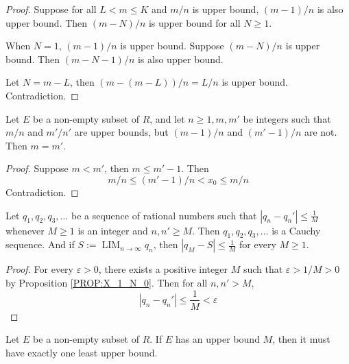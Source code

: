 \documentclass{blog}
\DeclareMathOperator{\LIM}{LIM}
\begin{document}
\begin{proof}
  Suppose for all $L < m \leq K$ and
  $m / n$ is upper bound, $(m - 1) / n$ is also upper bound.
  Then $(m - N) / n$ is upper bound for all $N \geq 1$.

  When $N = 1$, $(m - 1) / n$ is upper bound.
  Suppose $(m - N) / n$ is upper bound.
  Then $(m - N - 1) / n$ is also upper bound.

  Let $N = m - L$, then
  $(m - (m - L)) / n = L / n$ is upper bound.
  Contradiction.
\end{proof}

\begin{lemma}
  Let $E$ be a non-empty subset of $R$,
  and let $n \geq 1, m, m'$ be integers such that
  $m / n$ and $m' / n'$ are upper bounds,
  but $(m - 1) / n$ and $(m' - 1) / n$ are not.
  Then $m = m'$.
\end{lemma}

\begin{proof}
  Suppose $m < m'$, then $m \leq m' - 1$.
  Then
  \begin{equation*}
    m / n \leq (m' - 1) / n < x_{0} \leq m / n
  \end{equation*}
  Contradiction.
\end{proof}

\begin{lemma}
  \label{LEM:Q_CAUCHY_SEQUENCE}
  Let $q_{1}, q_{2}, q_{3}, \dots$ be a sequence of rational numbers such that
  $|q_{n} - q_{n}'| \leq \frac{1}{M}$ whenever $M \geq 1$ is an integer and $n, n' \geq M$.
  Then $q_{1}, q_{2}, q_{3}, \dots$ is a Cauchy sequence.
  And if $S := \LIM_{n \to \infty} q_{n}$, then
  $|q_{M} - S| \leq \frac{1}{M}$ for every $M \geq 1$.
\end{lemma}

\begin{proof}
  For every $\varepsilon > 0$,
  there exists a positive integer $M$
  such that $\varepsilon > 1 / M > 0$ by Proposition \ref{PROP:X_1_N_0}.
  Then for all $n, n' > M$,
  \begin{equation*}
    |q_{n} - q_{n}'| \leq \frac{1}{M} < \varepsilon
  \end{equation*}
\end{proof}

\begin{theorem}
  Let $E$ be a non-empty subset of $R$.
  If $E$ has an upper bound $M$, then it must have exactly one least upper bound.
\end{theorem}
\end{document}
